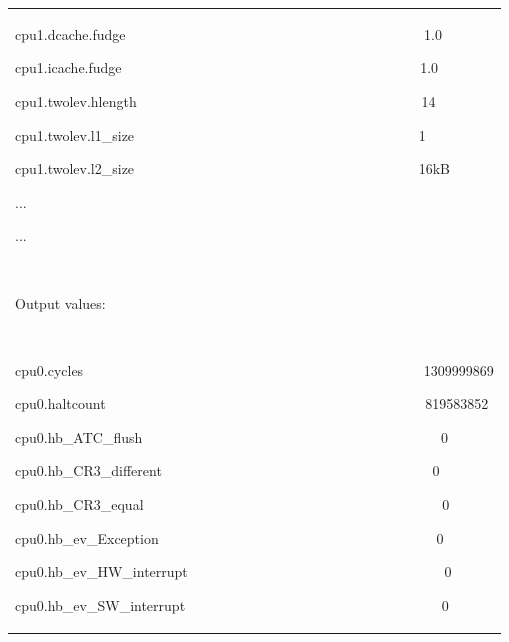 \documentclass[a4paper]{article}
\begin{document}
\begin{flushleft}
\begin{tiny}
\begin{supertabular}{|m{6.34626in}|}
{\ttfamily cpu1.dcache.fudge
\ \ \ \ \ \ \ \ \ \ \ \ \ \ \ \ \ \ \ \ \ \ \ \ \ \ \ \ \ \ \ \ \ \ \ \ \ \ \ \ \ \ 1.0}

{\ttfamily cpu1.icache.fudge
\ \ \ \ \ \ \ \ \ \ \ \ \ \ \ \ \ \ \ \ \ \ \ \ \ \ \ \ \ \ \ \ \ \ \ \ \ \ \ \ \ \ 1.0}

{\ttfamily cpu1.twolev.hlength
\ \ \ \ \ \ \ \ \ \ \ \ \ \ \ \ \ \ \ \ \ \ \ \ \ \ \ \ \ \ \ \ \ \ \ \ \ \ \ \ 14}

{\ttfamily cpu1.twolev.l1\_size
\ \ \ \ \ \ \ \ \ \ \ \ \ \ \ \ \ \ \ \ \ \ \ \ \ \ \ \ \ \ \ \ \ \ \ \ \ \ \ \ 1}

{\ttfamily cpu1.twolev.l2\_size
\ \ \ \ \ \ \ \ \ \ \ \ \ \ \ \ \ \ \ \ \ \ \ \ \ \ \ \ \ \ \ \ \ \ \ \ \ \ \ \ 16kB}

{\ttfamily ...}

{\ttfamily ...}

~

{\ttfamily Output values:}

~

{\ttfamily cpu0.cycles
\ \ \ \ \ \ \ \ \ \ \ \ \ \ \ \ \ \ \ \ \ \ \ \ \ \ \ \ \ \ \ \ \ \ \ \ \ \ \ \ \ \ \ \ \ \ \ \ 1309999869}

{\ttfamily cpu0.haltcount
\ \ \ \ \ \ \ \ \ \ \ \ \ \ \ \ \ \ \ \ \ \ \ \ \ \ \ \ \ \ \ \ \ \ \ \ \ \ \ \ \ \ \ \ \ 819583852}

{\ttfamily cpu0.hb\_ATC\_flush
\ \ \ \ \ \ \ \ \ \ \ \ \ \ \ \ \ \ \ \ \ \ \ \ \ \ \ \ \ \ \ \ \ \ \ \ \ \ \ \ \ \ 0}

{\ttfamily cpu0.hb\_CR3\_different
\ \ \ \ \ \ \ \ \ \ \ \ \ \ \ \ \ \ \ \ \ \ \ \ \ \ \ \ \ \ \ \ \ \ \ \ \ \ 0}

{\ttfamily cpu0.hb\_CR3\_equal
\ \ \ \ \ \ \ \ \ \ \ \ \ \ \ \ \ \ \ \ \ \ \ \ \ \ \ \ \ \ \ \ \ \ \ \ \ \ \ \ \ \ 0}

{\ttfamily cpu0.hb\_ev\_Exception
\ \ \ \ \ \ \ \ \ \ \ \ \ \ \ \ \ \ \ \ \ \ \ \ \ \ \ \ \ \ \ \ \ \ \ \ \ \ \ 0}

{\ttfamily cpu0.hb\_ev\_HW\_interrupt
\ \ \ \ \ \ \ \ \ \ \ \ \ \ \ \ \ \ \ \ \ \ \ \ \ \ \ \ \ \ \ \ \ \ \ \ 0}

{\ttfamily cpu0.hb\_ev\_SW\_interrupt
\ \ \ \ \ \ \ \ \ \ \ \ \ \ \ \ \ \ \ \ \ \ \ \ \ \ \ \ \ \ \ \ \ \ \ \ 0}


\end{supertabular}
\end{tiny}
\end{flushleft}
\end{document}
